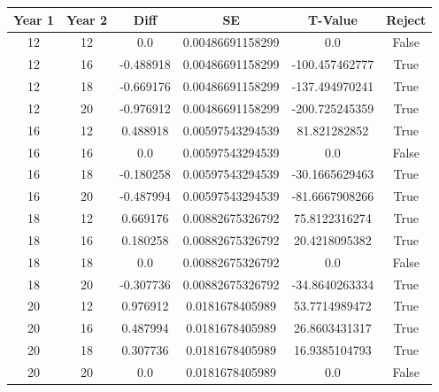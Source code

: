 \begin{tabular}{ c c c c c c } \\ Year 1 & Year 2 & Diff & SE & T-Value & Reject \\ 
 \hline 
12 & 12 & 0.0 & 0.00486691158299 & 0.0 & False \\ 
12 & 16 & -0.488918 & 0.00486691158299 & -100.457462777 & True \\ 
12 & 18 & -0.669176 & 0.00486691158299 & -137.494970241 & True \\ 
12 & 20 & -0.976912 & 0.00486691158299 & -200.725245359 & True \\ 
16 & 12 & 0.488918 & 0.00597543294539 & 81.821282852 & True \\ 
16 & 16 & 0.0 & 0.00597543294539 & 0.0 & False \\ 
16 & 18 & -0.180258 & 0.00597543294539 & -30.1665629463 & True \\ 
16 & 20 & -0.487994 & 0.00597543294539 & -81.6667908266 & True \\ 
18 & 12 & 0.669176 & 0.00882675326792 & 75.8122316274 & True \\ 
18 & 16 & 0.180258 & 0.00882675326792 & 20.4218095382 & True \\ 
18 & 18 & 0.0 & 0.00882675326792 & 0.0 & False \\ 
18 & 20 & -0.307736 & 0.00882675326792 & -34.8640263334 & True \\ 
20 & 12 & 0.976912 & 0.0181678405989 & 53.7714989472 & True \\ 
20 & 16 & 0.487994 & 0.0181678405989 & 26.8603431317 & True \\ 
20 & 18 & 0.307736 & 0.0181678405989 & 16.9385104793 & True \\ 
20 & 20 & 0.0 & 0.0181678405989 & 0.0 & False \\ 
\end{tabular}